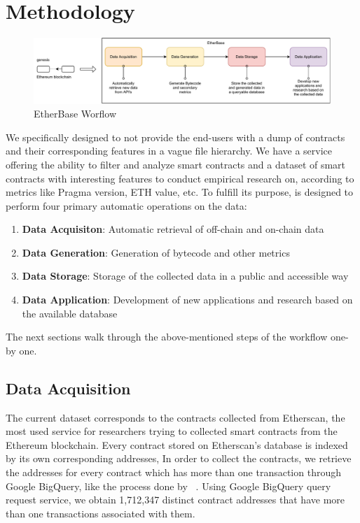 \section{Methodology}

	\begin{figure}[t]
		\centering
		\includegraphics[width=1\textwidth]{figures/Untitled Diagram.pdf}
		\caption{EtherBase Worflow}
		\label{fig:my_label}
	\end{figure}
	
	We specifically designed \etherbase to not provide the end-users with a dump of contracts and their corresponding features in a vague file hierarchy.
	We have a service offering the ability to filter and analyze smart contracts and a dataset of smart contracts with interesting features to conduct empirical research on, according to metrics like Pragma version, ETH value, etc.
	To fulfill its purpose, \etherbase is designed to perform four primary automatic operations on the data:
	\begin{enumerate}
		\item \textbf{Data Acquisiton}: Automatic retrieval of off-chain and on-chain data
		\item \textbf{Data Generation}: Generation of bytecode and other metrics
		\item \textbf{Data Storage}: Storage of the collected data in a public and accessible way
		\item \textbf{Data Application}: Development of new applications and research based on the available database
	\end{enumerate}

	The next sections walk through the above-mentioned steps of the workflow one-by one.

	\subsection{Data Acquisition}
		The current dataset corresponds to the contracts collected from Etherscan, the most used service for researchers trying to collected smart contracts from the Ethereum blockchain.
		Every contract stored on Etherscan's database is indexed by its own corresponding addresses,
		In order to collect the contracts, we retrieve the addresses for every contract which has more than one transaction through Google BigQuery, like the process done by ~\cite{Empirical-Evaluation-of-Smart-Contract-Testing:What-is-the-Best-Choice}.
		Using Google BigQuery query request service, we obtain 1,712,347 distinct contract addresses that have more than one transactions associated with them.


